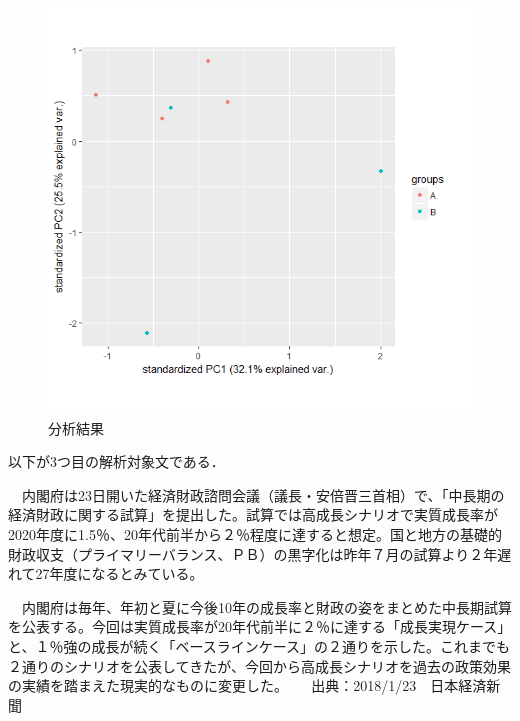 \begin{figure}[htb]
\centering
\includegraphics[width=13cm]{5-2.png}
\caption{分析結果}\label{5-2}
\end{figure}
\newpage

以下が3つ目の解析対象文である．

　内閣府は23日開いた経済財政諮問会議（議長・安倍晋三首相）で、「中長期の経済財政に関する試算」を提出した。試算では高成長シナリオで実質成長率が2020年度に1.5％、20年代前半から２％程度に達すると想定。国と地方の基礎的財政収支（プライマリーバランス、ＰＢ）の黒字化は昨年７月の試算より２年遅れて27年度になるとみている。

　内閣府は毎年、年初と夏に今後10年の成長率と財政の姿をまとめた中長期試算を公表する。今回は実質成長率が20年代前半に２％に達する「成長実現ケース」と、１％強の成長が続く「ベースラインケース」の２通りを示した。これまでも２通りのシナリオを公表してきたが、今回から高成長シナリオを過去の政策効果の実績を踏まえた現実的なものに変更した。
　
出典：2018/1/23　日本経済新聞

